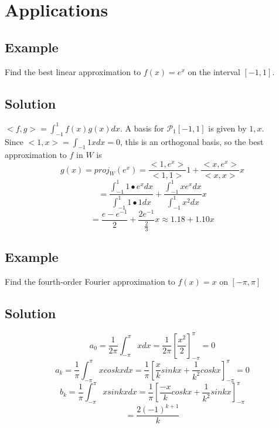 \section{Applications}
\subsection*{Example}
Find the best linear approximation to $f(x) = e^x$ on the interval $[-1, 1]$.
\subsection*{Solution}
$<f,g> = \int_{-1}^{1} f(x)g(x) dx$. A basis for $\mathscr{P}_1[-1,1]$ is given by ${1,x}$. \\
Since $<1,x> = \int_{-1}{1} x dx = 0$, this is an orthogonal basis, so the best approximation to $f$ in $W$ is
$$g(x) = proj_W(e^x) = \frac{<1,e^x>}{<1,1>}1 + \frac{<x,e^x>}{<x,x>}x$$
$$= \frac{\int_{-1}^{1}1\bullet e^x dx}{\int_{-1}^{1}1\bullet 1 dx} + \frac{\int_{-1}^{1}xe^x dx}{\int_{-1}^{1}x^2 dx}x$$
$$= \frac{e-e^{-1}}{2} + \frac{2e^{-1}}{\frac{2}{3}}x \approx 1.18 + 1.10x$$
\subsection*{Example}
Find the fourth-order Fourier approximation to $f(x) = x$ on $ [-\pi, \pi]$
\subsection*{Solution}
$$a_0 = \frac{1}{2\pi}\int_{-\pi}^{\pi} x dx = \frac{1}{2\pi}[\frac{x^2}{2}]^\pi_{-\pi} = 0$$
$$a_k = \frac{1}{\pi}\int_{-\pi}^{\pi} xcoskx dx = \frac{1}{\pi}[\frac{x}{k}sinkx + \frac{1}{k^2}coskx]^\pi_{-\pi} = 0$$
$$b_k = \frac{1}{\pi}\int_{-\pi}^{\pi} x sinkx dx = \frac{1}{\pi}[\frac{-x}{k}cos kx + \frac{1}{k^2}sinkx]^\pi_{-\pi}$$
$$= \frac{2(-1)^{k+1}}{k}$$